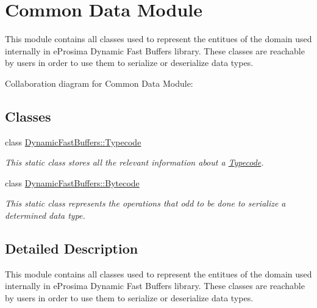 \hypertarget{group___c_o_m_m_o_n_d_a_t_a_m_o_d_u_l_e}{\section{Common Data Module}
\label{group___c_o_m_m_o_n_d_a_t_a_m_o_d_u_l_e}
}


This module contains all classes used to represent the entitues of the domain used internally in e\-Prosima Dynamic Fast Buffers library. These classes are reachable by users in order to use them to serialize or deserialize data types.  


Collaboration diagram for Common Data Module\-:
\subsection*{Classes}
\begin{DoxyCompactItemize}
\item 
class \hyperlink{class_dynamic_fast_buffers_1_1_typecode}{Dynamic\-Fast\-Buffers\-::\-Typecode}
\begin{DoxyCompactList}\small\item\em This static class stores all the relevant information about a \hyperlink{class_dynamic_fast_buffers_1_1_typecode}{Typecode}. \end{DoxyCompactList}\item 
class \hyperlink{class_dynamic_fast_buffers_1_1_bytecode}{Dynamic\-Fast\-Buffers\-::\-Bytecode}
\begin{DoxyCompactList}\small\item\em This static class represents the operations that odd to be done to serialize a determined data type. \end{DoxyCompactList}\end{DoxyCompactItemize}


\subsection{Detailed Description}
This module contains all classes used to represent the entitues of the domain used internally in e\-Prosima Dynamic Fast Buffers library. These classes are reachable by users in order to use them to serialize or deserialize data types. 